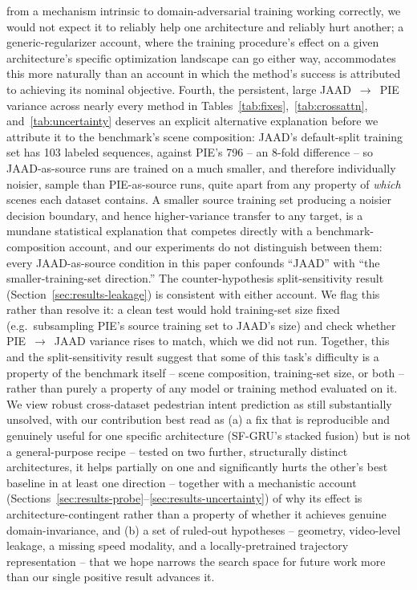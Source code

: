 from a mechanism intrinsic to domain-adversarial training working
correctly, we would not expect it to reliably help one architecture
and reliably hurt another; a generic-regularizer account, where the
training procedure's effect on a given architecture's specific
optimization landscape can go either way, accommodates this more
naturally than an account in which the method's success is attributed
to achieving its nominal objective. Fourth, the persistent, large
JAAD~$\to$~PIE variance across
nearly every method in Tables~\ref{tab:fixes},~\ref{tab:crossattn},
and~\ref{tab:uncertainty}
deserves an explicit alternative explanation before we attribute it to
the benchmark's scene composition: JAAD's default-split training set
has 103 labeled sequences, against PIE's 796 -- an 8-fold difference --
so JAAD-as-source runs are trained on a much smaller, and therefore
individually noisier, sample than PIE-as-source runs, quite apart from
any property of \emph{which} scenes each dataset contains. A smaller
source training set producing a noisier decision boundary, and hence
higher-variance transfer to any target, is a mundane statistical
explanation that competes directly with a benchmark-composition
account, and our experiments do not distinguish between them: every
JAAD-as-source condition in this paper confounds ``JAAD'' with
``the smaller-training-set direction.'' The counter-hypothesis
split-sensitivity result (Section~\ref{sec:results-leakage}) is
consistent with either account. We flag this rather than resolve it: a
clean test would hold training-set size fixed (e.g.\ subsampling PIE's
source training set to JAAD's size) and check whether PIE~$\to$~JAAD
variance rises to match, which we did not run. Together, this and the
split-sensitivity result suggest that some of
this task's difficulty is a property of the benchmark itself --
scene composition, training-set size, or both -- rather than purely a
property of any model or training method evaluated on it. We view
robust cross-dataset pedestrian intent prediction as still substantially
unsolved, with our contribution best read as (a) a fix that is
reproducible and genuinely useful for one specific architecture
(SF-GRU's stacked fusion) but is not a general-purpose recipe --
tested on two further, structurally distinct architectures, it helps
partially on one and significantly hurts the other's best baseline in
at least one direction -- together with a mechanistic account
(Sections~\ref{sec:results-probe}--\ref{sec:results-uncertainty}) of
why its effect is architecture-contingent rather than a property of
whether it achieves genuine domain-invariance, and (b) a set of
ruled-out hypotheses -- geometry, video-level leakage, a missing speed
modality, and a locally-pretrained trajectory representation -- that we
hope narrows the search space for future work more than our single
positive result advances it.
